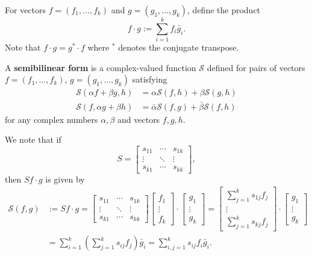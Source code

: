 \documentclass[11pt, oneside, a4paper]{article}
\begin{document}
\begin{defn}\cite[p.285]{CoddingtonLevinson}\label{defn:f cdot g}
    For vectors $f=(f_1,\ldots,f_k)$ and $g=(g_1,\ldots,g_k)$, define the product
    \[f\cdot g:=\sum_{i=1}^k f_i\bar{g}_i.\]
    Note that $f\cdot g = g^*\cdot f$ where $^*$ denotes the conjugate transpose.
\end{defn}

\begin{defn}\cite[p.285]{CoddingtonLevinson}\label{defn:semibilinear form}
    A \textbf{semibilinear form} is a complex-valued function $\mathcal{S}$ defined for pairs of vectors $f=(f_1,\ldots,f_k)$, $g=(g_1,\ldots,g_k)$ satisfying
    \begin{align*}
        \mathcal{S}(\alpha f+\beta g, h)&=\alpha\mathcal{S}(f,h) + \beta\mathcal{S}(g,h)\\
        \mathcal{S}(f, \alpha g + \beta h) &= \bar{\alpha}\mathcal{S}(f,g) + \bar{\beta}\mathcal{S}(f, h)
    \end{align*}
    for any complex numbers $\alpha, \beta$ and vectors $f,g,h$.
\end{defn}
We note that if
\[S = \begin{bmatrix}
    s_{11} & \cdots & s_{1k}\\
    \vdots & \ddots & \vdots\\
    s_{k1} & \cdots & s_{kk}
\end{bmatrix},\]
then $Sf\cdot g$ is given by
\begin{equation}\label{eq:semibilinear form}
    \begin{split}
    \mathcal{S}(f,g) &:= Sf\cdot g = \begin{bmatrix}
        s_{11} & \cdots & s_{1k}\\
        \vdots & \ddots & \vdots\\
        s_{k1} & \cdots & s_{kk}
    \end{bmatrix} \begin{bmatrix}
        f_1\\
        \vdots\\
        f_k
    \end{bmatrix} \cdot \begin{bmatrix}
        g_1\\
        \vdots\\
        g_k
    \end{bmatrix} = \begin{bmatrix}
        \sum_{j=1}^k s_{1j}f_j\\
        \vdots\\
        \sum_{j=1}^k s_{kj}f_j
    \end{bmatrix}\cdot \begin{bmatrix}
        g_1\\
        \vdots\\
        g_k
    \end{bmatrix}\\
    &= \sum_{i=1}^k\left(\sum_{j=1}^k s_{ij}f_j\right)\bar{g}_i =\sum_{i,j=1}^k s_{ij}f_i\bar{g}_i.
    \end{split}
\end{equation}
\end{document}
